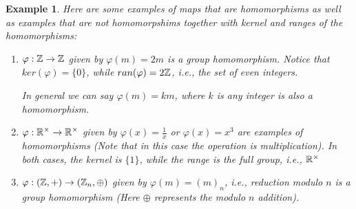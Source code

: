 \documentclass[12pt]{article}
\theoremstyle{plain}
\newtheorem{example}{Example}
\theoremstyle{definition}
\theoremstyle{remark}
\begin{document}
\begin{example}
Here are some examples of maps that are homomorphisms as well as examples that are not homomorpshims together with kernel and ranges of the homomorphisms:
\begin{enumerate}
    \item $\varphi: \mathbb{Z}\rightarrow \mathbb{Z}$ given by $\varphi(m)=2m$
 is a group homomorphism. 
Notice that $ker(\varphi) = \{0\}$, while $ran(\varphi) = 2\mathbb{Z}$, i.e., the set of even integers. 

 In general we can say $\varphi(m)=km$, where $k$ is any integer is also a homomorphism. 
 
 \item $\varphi:\mathbb{R}^{\times} \rightarrow \mathbb{R}^{\times}$ given by $\varphi(x)=\frac{1}{x}$ or $\varphi(x)=x^3$ are examples of homomorphisms (Note that in this case the operation is multiplication). In both cases, the kernel is $\{1\}$, while the range is the full group, i.e., $\mathbb{R}^{\times}$  
 \item $\varphi:(\mathbb{Z},+) \rightarrow (\mathbb{Z}_n, \oplus)$ given by 
 $\varphi(m) = (m)_n$, i.e., reduction modulo $n$ is a group homomorphism (Here $\oplus$ represents the modulo $n$ addition). 
 

\end{enumerate}
\end{example}
\end{document}
